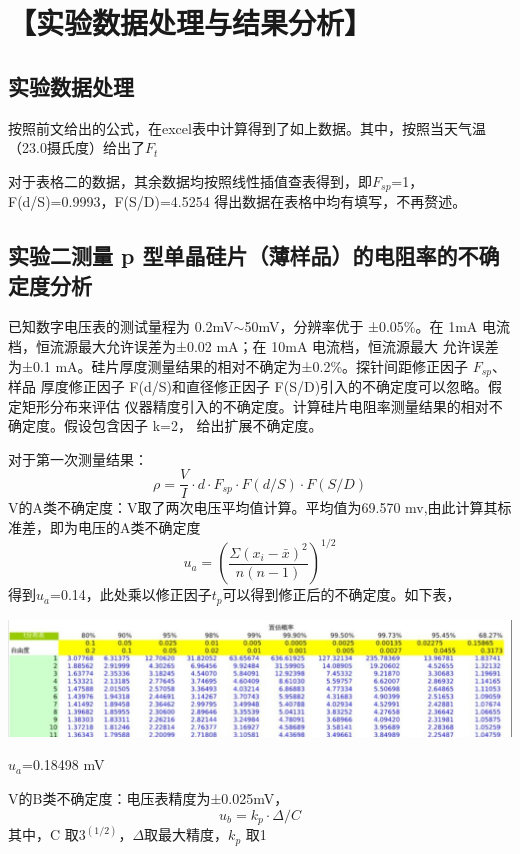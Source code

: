 \documentclass[a4paper,utf8]{article}
\begin{document}
\section*{【实验数据处理与结果分析】}
    \subsection*{实验数据处理}

按照前文给出的公式，在excel表中计算得到了如上数据。其中，按照当天气温（23.0摄氏度）给出了$F_{t}$

对于表格二的数据，其余数据均按照线性插值查表得到，即$F_{sp} $=1，F(d/S)=0.9993，F(S/D)=4.5254
得出数据在表格中均有填写，不再赘述。

    \subsection*{实验二测量 p 型单晶硅片（薄样品）的电阻率的不确定度分析}
    已知数字电压表的测试量程为 0.2mV$\sim$50mV，分辨率优于
    ±0.05\%。在 1mA 电流档，恒流源最大允许误差为±0.02 mA；在 10mA 电流档，恒流源最大
    允许误差为±0.1 mA。硅片厚度测量结果的相对不确定为±0.2\%。探针间距修正因子 $F_{sp}$、样品
    厚度修正因子 F(d/S)和直径修正因子 F(S/D)引入的不确定度可以忽略。假定矩形分布来评估
    仪器精度引入的不确定度。计算硅片电阻率测量结果的相对不确定度。假设包含因子 k=2，
    给出扩展不确定度。

    对于第一次测量结果：
\begin{equation*}
    \rho = \frac{V}{I} \cdot d \cdot F_{sp} \cdot F(d/S) \cdot F(S/D)
\end{equation*}
    V的A类不确定度：V取了两次电压平均值计算。平均值为69.570 mv,由此计算其标准差，即为电压的A类不确定度
    \begin{equation*}
        u_a =(\frac{\Sigma (x_i-\bar{x})^2}{n(n-1)})^{1/2}
    \end{equation*}
    得到$u_a$=0.14，此处乘以修正因子$t_p$可以得到修正后的不确定度。如下表，
    \begin{center}
        \includegraphics[width=400pt]{3.png}
    \end{center}
    $u_a$=0.18498 mV

    V的B类不确定度：电压表精度为±0.025mV，
    \begin{equation*}
        u_b = k_p \cdot \Delta / C
    \end{equation*}
    其中，C 取$3^(1/2)$，$\Delta $取最大精度，$k_p$ 取1
\end{document}

